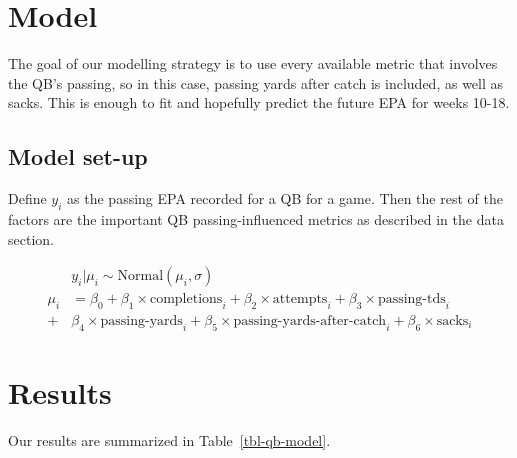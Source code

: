 \documentclass[
  letterpaper,
  DIV=11,
  numbers=noendperiod]{scrartcl}
\begin{document}
\section{Model}\label{model}

The goal of our modelling strategy is to use every available metric that
involves the QB's passing, so in this case, passing yards after catch is
included, as well as sacks. This is enough to fit and hopefully predict
the future EPA for weeks 10-18.

\subsection{Model set-up}\label{model-set-up}

Define \(y_i\) as the passing EPA recorded for a QB for a game. Then the
rest of the factors are the important QB passing-influenced metrics as
described in the data section.

\[
\begin{aligned}
& y_i|\mu_i\sim \mbox{Normal}(\mu_i, \sigma)\\
\mu_i & = \beta_0+\beta_1 \times \mbox{completions}_i + \beta_2 \times \mbox{attempts}_i +\beta_3 \times \mbox{passing-tds}_i \\ + &\beta_4 \times \mbox{passing-yards}_i +\beta_5 \times \mbox{passing-yards-after-catch}_i +\beta_6 \times \mbox{sacks}_i
\end{aligned}
\]

\subsubsection{}\label{section}

\section{Results}\label{results}

Our results are summarized in Table~\ref{tbl-qb-model}.
\end{document}
